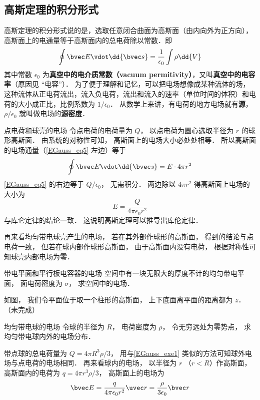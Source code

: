 \subsection{高斯定理的积分形式}

高斯定理的积分形式说的是，选取任意闭合曲面为高斯面（由内向外为正方向），高斯面上的电通量等于高斯面内的总电荷除以常数．即
\begin{equation}\label{EGauss_eq5}
\oint \bvec E \vdot \dd{\bvec s}  = \frac{1}{\epsilon_0} \int \rho \dd{V}
\end{equation} 
其中常数 $\epsilon_0$ 为\textbf{真空中的电介质常数（vacuum permitivity）}，又叫\textbf{真空中的电容率}（原因见 “电容”）． 为了便于理解和记忆，可以把电场想像成某种流体的场，这种流体从正电荷流出，流入负电荷，流出和流入的速率（单位时间的体积）和电荷的大小成正比，比例系数为 $1/\epsilon_0$． 从数学上来讲，有电荷的地方电场就有\textbf{源}， $\rho /\epsilon_0$ 就叫做电场的\textbf{源密度}．

\begin{example}{点电荷和球壳的电场}\label{EGauss_exe1}
令点电荷的电荷量为 $Q$， 以点电荷为圆心选取半径为 $r$ 的球形高斯面． 由系统的对称性可知， 高斯面上的电场大小必处处相等． 所以高斯面的电场通量（\autoref{EGauss_eq5} 左边）等于
\begin{equation}
\oint \bvec E \vdot \dd{\bvec s} = E \cdot 4\pi r^2
\end{equation}
\autoref{EGauss_eq5} 的右边等于 $Q/\epsilon_0$， 无需积分． 两边除以 $4\pi r^2$ 得高斯面上电场的大小为
\begin{equation}
E = \frac{Q}{4\pi\epsilon_0 r^2}
\end{equation}
与库仑定律的结论一致． 这说明高斯定理可以推导出库伦定律．

再来看均匀带电球壳产生的电场， 若在其外部作球形的高斯面， 得到的结论与点电荷一致， 但若在球内部作球形高斯面， 由于高斯面内没有电荷， 根据对称性可知球壳内部电场为零．
\end{example}


\begin{example}{带电平面和平行板电容器的电场}
空间中有一块无限大的厚度不计的均匀带电平面， 面电荷密度为 $\sigma$， 求空间中的电场．

如图， 我们令平面位于取一个柱形的高斯面， 上下底面离平面的距离都为 $z$． 
（未完成）
\end{example}

\begin{example}{均匀带电球的电场}\label{EGauss_exe3}
令球的半径为 $R$， 电荷密度为 $\rho$， 令无穷远处为零势点， 求均匀带电球内外的电场分布． 

带点球的总电荷量为 $Q = 4\pi R^3\rho/3$， 用与\autoref{EGauss_exe1} 类似的方法可知球外电场与点电荷的电场相同． 再来看球内的电场， 以半径为 $r$ （$r < R$）作高斯面， 高斯面内的电荷为 $q = 4\pi r^3\rho/3$， 高斯面上的电场为
\begin{equation}
\bvec E = \frac{q}{4\pi\epsilon_0 r^2} \uvec r = \frac{\rho}{3\epsilon_0}\bvec r
\end{equation}
\end{example}

